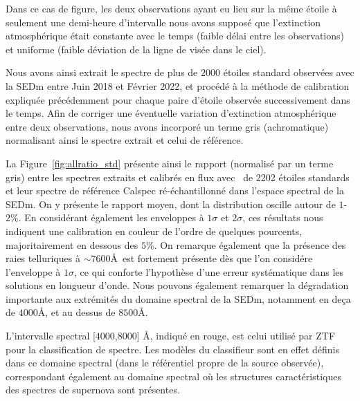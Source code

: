 \documentclass[../main/main.tex]{subfiles}
\begin{document}
Dans ce cas de figure, les deux observations ayant eu lieu sur la même
étoile à seulement une demi-heure d'intervalle nous avons supposé que
l'extinction atmosphérique était constante avec le temps (faible délai
entre les observations) et uniforme (faible déviation de la ligne de
visée dans le ciel).

Nous avons ainsi extrait le spectre de plus de $2000$ étoiles standard
observées avec la SEDm entre Juin 2018 et Février 2022, et procédé
à la méthode de calibration expliquée précédemment pour chaque paire d'étoile observée
successivement dans le temps.
Afin de corriger une éventuelle variation d'extinction atmosphérique
entre deux observations, nous avons incorporé un terme gris
(achromatique) normalisant ainsi le spectre extrait et celui de référence.

La Figure~\ref{fig:allratio_std} présente ainsi le rapport (normalisé par
un terme gris) entre les spectres extraits et calibrés en flux avec \hypergal\ de 2202 étoiles
standards et leur spectre de référence Calspec ré-échantillonné dans
l'espace spectral de la SEDm. On y présente le rapport moyen, dont la
distribution oscille autour de $1$-$2\%$. En considérant également les
enveloppes à $1\sigma$ et $2\sigma$, ces résultats nous indiquent une
calibration en couleur de l'ordre de quelques pourcents, majoritairement
en dessous des $5\%$. On remarque également que la présence des raies
telluriques à $\sim7600$\AA\ est fortement présente dès que l'on
considére l'enveloppe à $1\sigma$, ce qui conforte l'hypothèse d'une
erreur systématique dans les solutions en longueur d'onde.
Nous pouvons également remarquer la dégradation importante aux
extrémités du domaine spectral de la SEDm, notamment en deça de
$4000$\AA, et au dessus de $8500$\AA.

L'intervalle spectral
[$4000$,$8000$] \AA, indiqué en rouge, est celui utilisé par ZTF pour
la classification de spectre. Les modèles du
classifieur  sont en effet définis dans ce
domaine spectral (dans le référentiel propre de la source observée),
correspondant
également au domaine spectral où les structures caractéristiques des
  spectres de supernova sont présentes.
\end{document}
